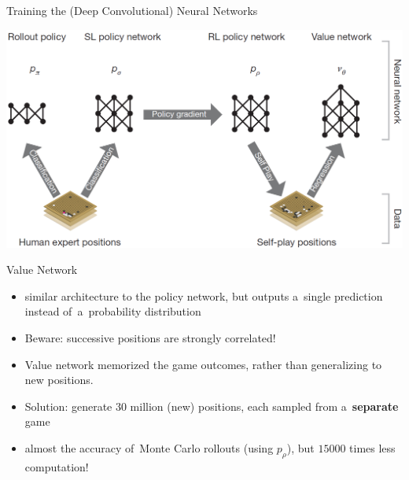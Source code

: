 \documentclass{beamer}
\begin{document}
{    \begin{frame}{Training the (Deep Convolutional) Neural Networks}
      \begin{center}
        \includegraphics[width=\textwidth]{../img/neural_nets_pipeline.png}
      \end{center}
    \end{frame}

    \begin{frame}{Value Network}
      \begin{itemize}[<+- | alert@+>]
        \item similar architecture to the policy network, but outputs a~single prediction instead of~a~probability distribution
        \item Beware: successive positions are strongly correlated!
        \item Value network memorized the game outcomes, rather than generalizing to new positions.
        \item Solution: generate 30 million (new) positions, each sampled from a~\textbf{separate} game
        \item almost the accuracy of~Monte Carlo rollouts (using $p_\rho$), but $15000$ times less computation!
      \end{itemize}
      \pause
    \end{frame}

}
\end{document}
